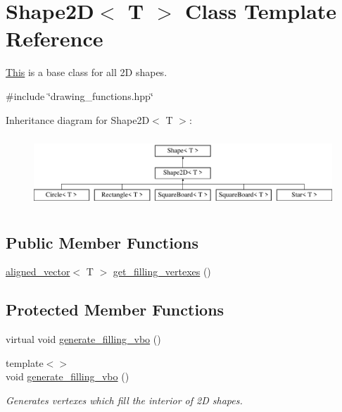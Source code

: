 \hypertarget{classShape2D}{}\section{Shape2D$<$ T $>$ Class Template Reference}
\label{classShape2D}


\mbox{\hyperlink{classThis}{This}} is a base class for all 2D shapes.  




{\ttfamily \#include \char`\"{}drawing\+\_\+functions.\+hpp\char`\"{}}

Inheritance diagram for Shape2D$<$ T $>$\+:\begin{figure}[H]
\begin{center}
\leavevmode
\includegraphics[height=2.688000cm]{classShape2D}
\end{center}
\end{figure}
\subsection*{Public Member Functions}
\begin{DoxyCompactItemize}
\item 
\mbox{\hyperlink{type__definitions_8hpp_a087efd587d66b881646ef378f1919c90}{aligned\+\_\+vector}}$<$ T $>$ \mbox{\hyperlink{classShape2D_af67c7aed6e58b5aa0e3518a3ad1de75b}{get\+\_\+filling\+\_\+vertexes}} ()
\end{DoxyCompactItemize}
\subsection*{Protected Member Functions}
\begin{DoxyCompactItemize}
\item 
virtual void \mbox{\hyperlink{classShape2D_a917c3277ca262ec557930c8cc837c204}{generate\+\_\+filling\+\_\+vbo}} ()
\item 
{\footnotesize template$<$$>$ }\\void \mbox{\hyperlink{classShape2D_a328d401b8f1962078e904d4b1003d7a5}{generate\+\_\+filling\+\_\+vbo}} ()
\begin{DoxyCompactList}\small\item\em Generates vertexes which fill the interior of 2D shapes. \end{DoxyCompactList}\end{DoxyCompactItemize}
